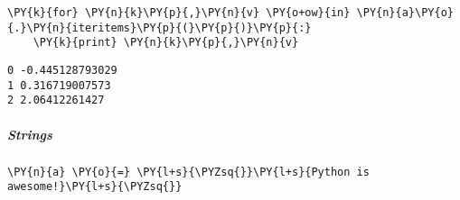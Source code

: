 {\par%
\vspace{-1\baselineskip}%
}%
\begin{notebookcell}[20]%
\begin{addmargin}[\cellleftmargin]{0em}%
{\smaller%
\par%
%
\vspace{-1\smallerfontscale}%
\begin{Verbatim}[commandchars=\\\{\}]
\PY{k}{for} \PY{n}{k}\PY{p}{,}\PY{n}{v} \PY{o+ow}{in} \PY{n}{a}\PY{o}{.}\PY{n}{iteritems}\PY{p}{(}\PY{p}{)}\PY{p}{:}
    \PY{k}{print} \PY{n}{k}\PY{p}{,}\PY{n}{v}
\end{Verbatim}
%
\par%
\vspace{-1\smallerfontscale}}%
\end{addmargin}
\end{notebookcell}

\par\vspace{1\smallerfontscale}%
    \begin{addmargin}[\cellleftmargin]{0em}%
    {\smaller%
    \vspace{-1\smallerfontscale}%
    
    \begin{Verbatim}[commandchars=\\\{\}]
0 -0.445128793029
1 0.316719007573
2 2.06412261427
    \end{Verbatim}
}%
    \end{addmargin}%

    \subparagraph{Strings}



{\par%
\vspace{-1\baselineskip}%
}%
\begin{notebookcell}[24]%
\begin{addmargin}[\cellleftmargin]{0em}%
{\smaller%
\par%
%
\vspace{-1\smallerfontscale}%
\begin{Verbatim}[commandchars=\\\{\}]
\PY{n}{a} \PY{o}{=} \PY{l+s}{\PYZsq{}}\PY{l+s}{Python is awesome!}\PY{l+s}{\PYZsq{}}
\end{Verbatim}
%
\par%
\vspace{-1\smallerfontscale}}%
\end{addmargin}
\end{notebookcell}


